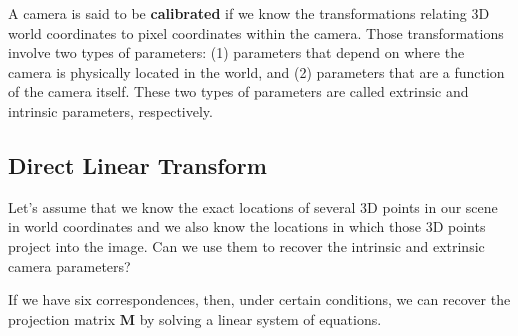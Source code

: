 A camera is said to be {\bf calibrated} if we know the transformations relating 3D world coordinates to pixel coordinates within the camera. Those transformations involve two types of parameters:  (1) parameters that depend on where the camera is physically located in the world, and (2) parameters that are a function of the camera itself.  These two types of parameters are called extrinsic and intrinsic parameters, respectively.


\subsection{Direct Linear Transform}

Let's assume that we know the exact locations of several 3D points in our scene in world coordinates and we also know the locations in which those 3D points project into the image. Can we use them to recover the intrinsic and extrinsic camera parameters? 

If we have six correspondences, then, under certain conditions, we can recover the projection matrix $\mathbf{M}$ by solving a linear system of equations. 

